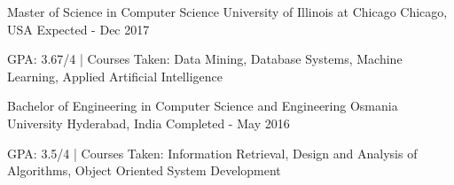 \begin{cventries}
  \cventry
    {Master of Science in Computer Science}
    {University of Illinois at Chicago}
    {Chicago, USA}
    {Expected - Dec 2017}
    {
      \begin{cvitems}
        \item {GPA: 3.67/4 | Courses Taken: Data Mining, Database Systems, Machine Learning, Applied Artificial Intelligence}
      \end{cvitems}
    }
    \cventry
    {Bachelor of Engineering in Computer Science and Engineering}
    {Osmania University}
    {Hyderabad, India}
    {Completed - May 2016}
    {
      \begin{cvitems}
        \item {GPA: 3.5/4 | Courses Taken: Information Retrieval, Design and Analysis of Algorithms, Object Oriented System Development}
      \end{cvitems}
    }
\end{cventries}
